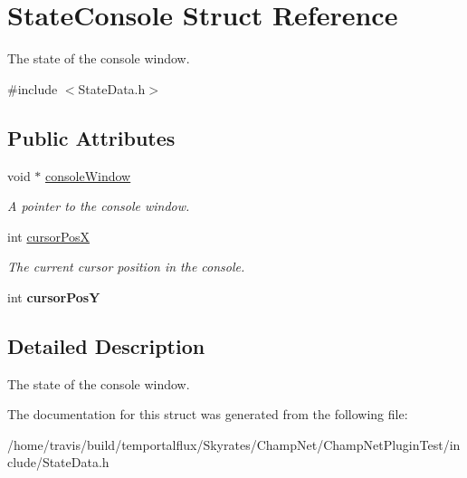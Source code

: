 \hypertarget{struct_state_console}{\section{State\-Console Struct Reference}
\label{struct_state_console}
}


The state of the console window.  




{\ttfamily \#include $<$State\-Data.\-h$>$}

\subsection*{Public Attributes}
\begin{DoxyCompactItemize}
\item 
\hypertarget{struct_state_console_a101e38bf2e857e66c26c4372e5e1d287}{void $\ast$ \hyperlink{struct_state_console_a101e38bf2e857e66c26c4372e5e1d287}{console\-Window}}\label{struct_state_console_a101e38bf2e857e66c26c4372e5e1d287}

\begin{DoxyCompactList}\small\item\em A pointer to the console window. \end{DoxyCompactList}\item 
\hypertarget{struct_state_console_ae75b5a93145d506e18b8ee8c3c1f4e2b}{int \hyperlink{struct_state_console_ae75b5a93145d506e18b8ee8c3c1f4e2b}{cursor\-Pos\-X}}\label{struct_state_console_ae75b5a93145d506e18b8ee8c3c1f4e2b}

\begin{DoxyCompactList}\small\item\em The current cursor position in the console. \end{DoxyCompactList}\item 
\hypertarget{struct_state_console_a76f3facf37788fb17949a59e1829ccd5}{int {\bfseries cursor\-Pos\-Y}}\label{struct_state_console_a76f3facf37788fb17949a59e1829ccd5}

\end{DoxyCompactItemize}


\subsection{Detailed Description}
The state of the console window. 

The documentation for this struct was generated from the following file\-:\begin{DoxyCompactItemize}
\item 
/home/travis/build/temportalflux/\-Skyrates/\-Champ\-Net/\-Champ\-Net\-Plugin\-Test/include/State\-Data.\-h\end{DoxyCompactItemize}
